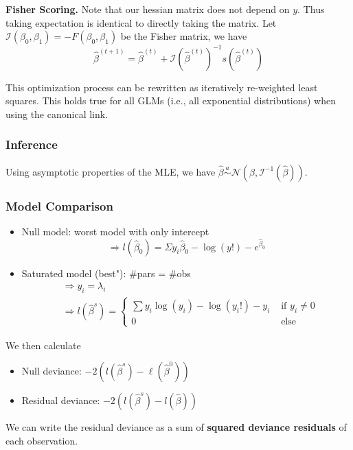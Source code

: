 \documentclass[11pt, %
	oneside, %
	english, %
	onehalfspacing, %
	]{article} %
\numberwithin{equation}{section}
\begin{document}
\textbf{Fisher Scoring.}
Note that our hessian matrix does not depend on $y$. Thus taking expectation is identical to directly taking the matrix. Let $\mathcal{I}(\beta_0, \beta_1) = -F(\beta_0, \beta_1)$ be the Fisher matrix, we have
$$
\hat{\beta}^{(t+1)} = \hat{\beta}^{(t)} + \mathcal{I}(\hat{\beta}^{(t)})^{-1} s(\hat{\beta}^{(t)})
$$

This optimization process can be rewritten as iteratively re-weighted least squares. This holds true for all GLMs (i.e., all exponential distributions) when using the canonical link.

\subsubsection*{Inference}

Using asymptotic properties of the MLE, we have $\hat{\beta} \stackrel{a}{\sim}\mathcal{N} \left(\beta, \mathcal{I}^{-1}(\hat{\beta})\right)$.

\subsubsection*{Model Comparison}

\begin{itemize}
	\item Null model: worst model with only intercept
    $$
    \Rightarrow l\left(\hat{\beta}_0\right)=\Sigma y_i \hat{\beta}_0-\log \left(y!\right)-e^{\hat{\beta}_0}
    $$
	\item Saturated model (best"): \#pars = \#obs
	$$
    \begin{aligned}
    & \Rightarrow y_i=\lambda_i \\
    & \Rightarrow l\left(\hat{\beta}^s\right)= \begin{cases}\sum y_i \log \left(y_i\right)-\log \left(y_{i}!\right)-y_i & \text { if } y_i \neq 0 \\
    0 & \text { else }\end{cases}
    \end{aligned}
    $$
\end{itemize}

We then calculate
\begin{itemize}
	\item Null deviance: $-2\left(l\left(\hat{\beta}^s\right)-\ell\left(\hat{\beta}^0\right)\right)$
	\item Residual deviance: $-2\left(l\left(\hat{\beta}^s\right)-l(\hat{\beta})\right)$
\end{itemize}
We can write the residual deviance as a sum of \textbf{squared deviance residuals} of each observation.
\end{document}
